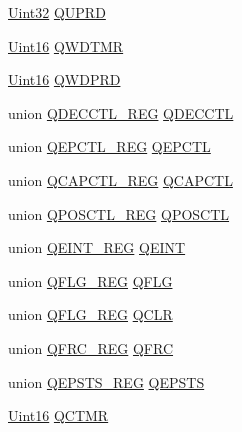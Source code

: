 \begin{DoxyCompactItemize}
\item 
\hyperlink{_d_s_p2833x___device_8h_aba99025e657f892beb7ff31cecf64653}{Uint32} \hyperlink{struct_e_q_e_p___r_e_g_s_a421e22312802be8823425cd62aca4a4b}{Q\+U\+P\+R\+D}
\item 
\hyperlink{_d_s_p2833x___device_8h_a59a9f6be4562c327cbfb4f7e8e18f08b}{Uint16} \hyperlink{struct_e_q_e_p___r_e_g_s_a313d77931944d22637cbabaf38964e39}{Q\+W\+D\+T\+M\+R}
\item 
\hyperlink{_d_s_p2833x___device_8h_a59a9f6be4562c327cbfb4f7e8e18f08b}{Uint16} \hyperlink{struct_e_q_e_p___r_e_g_s_a8bd38f968477a12dc788c9cc37b1e2d5}{Q\+W\+D\+P\+R\+D}
\item 
union \hyperlink{union_q_d_e_c_c_t_l___r_e_g}{Q\+D\+E\+C\+C\+T\+L\+\_\+\+R\+E\+G} \hyperlink{struct_e_q_e_p___r_e_g_s_aa7af3d618f15f2638bede48909caeea3}{Q\+D\+E\+C\+C\+T\+L}
\item 
union \hyperlink{union_q_e_p_c_t_l___r_e_g}{Q\+E\+P\+C\+T\+L\+\_\+\+R\+E\+G} \hyperlink{struct_e_q_e_p___r_e_g_s_a1103cb04613f4e933cb854b59363e3a2}{Q\+E\+P\+C\+T\+L}
\item 
union \hyperlink{union_q_c_a_p_c_t_l___r_e_g}{Q\+C\+A\+P\+C\+T\+L\+\_\+\+R\+E\+G} \hyperlink{struct_e_q_e_p___r_e_g_s_a9d4b27278a621aad04be4039f59b0612}{Q\+C\+A\+P\+C\+T\+L}
\item 
union \hyperlink{union_q_p_o_s_c_t_l___r_e_g}{Q\+P\+O\+S\+C\+T\+L\+\_\+\+R\+E\+G} \hyperlink{struct_e_q_e_p___r_e_g_s_affb91c511aa51dc9978b1efda3b26d2f}{Q\+P\+O\+S\+C\+T\+L}
\item 
union \hyperlink{union_q_e_i_n_t___r_e_g}{Q\+E\+I\+N\+T\+\_\+\+R\+E\+G} \hyperlink{struct_e_q_e_p___r_e_g_s_a4b44e230c8b171ee5ca4d6812068137c}{Q\+E\+I\+N\+T}
\item 
union \hyperlink{union_q_f_l_g___r_e_g}{Q\+F\+L\+G\+\_\+\+R\+E\+G} \hyperlink{struct_e_q_e_p___r_e_g_s_a291708821e523a51635059e7f59873dc}{Q\+F\+L\+G}
\item 
union \hyperlink{union_q_f_l_g___r_e_g}{Q\+F\+L\+G\+\_\+\+R\+E\+G} \hyperlink{struct_e_q_e_p___r_e_g_s_a7114f2e5d0a7d2be1bd4b6ed8aea9988}{Q\+C\+L\+R}
\item 
union \hyperlink{union_q_f_r_c___r_e_g}{Q\+F\+R\+C\+\_\+\+R\+E\+G} \hyperlink{struct_e_q_e_p___r_e_g_s_a1884411644bbac741ff0939811d0f8ba}{Q\+F\+R\+C}
\item 
union \hyperlink{union_q_e_p_s_t_s___r_e_g}{Q\+E\+P\+S\+T\+S\+\_\+\+R\+E\+G} \hyperlink{struct_e_q_e_p___r_e_g_s_a96b7e8ee9d3db7034910e558e9f3292c}{Q\+E\+P\+S\+T\+S}
\item 
\hyperlink{_d_s_p2833x___device_8h_a59a9f6be4562c327cbfb4f7e8e18f08b}{Uint16} \hyperlink{struct_e_q_e_p___r_e_g_s_ae506343d05ced9e18eabf26c3cc35eb5}{Q\+C\+T\+M\+R}

\end{DoxyCompactItemize}
